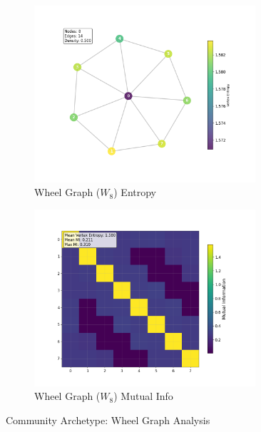 \documentclass[12pt, letterpaper]{article}
\begin{document}
\begin{figure}[H]
    \centering
    \begin{subfigure}[b]{0.48\textwidth}
        \includegraphics[width=0.9\textwidth]{images/Graph Visualizations/Community/Wheel_Graph_Vertex_Entropy.png}
        \caption{Wheel Graph ($W_8$) Entropy}
        \label{fig:wheel_entropy}
    \end{subfigure}
    \hfill
    \begin{subfigure}[b]{0.48\textwidth}
        \includegraphics[width=0.9\textwidth]{images/Graph Visualizations/Community/Wheel_Graph_MI_Matrix.png}
        \caption{Wheel Graph ($W_8$) Mutual Info}
        \label{fig:wheel_mi}
    \end{subfigure}
    \caption{Community Archetype: Wheel Graph Analysis}
    \label{fig:wheel_analysis}
\end{figure}
\end{document}
